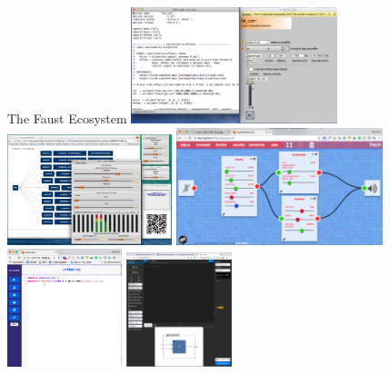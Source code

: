 \begin{frame}[fragile]{The Faust Ecosystem}
	\centering
	\includegraphics[width=0.45\textwidth]{images/faustgen}
	\hspace{0.25cm}
	\includegraphics[width=0.36\textwidth]{images/FaustLiveSession}
	\vspace{0.25cm}
	\href{https://faustplayground.grame.fr/}{\includegraphics[width=0.45\textwidth]{images/faustplayground1}}
	\hspace{0.1cm}
	\href{https://fausteditor.grame.fr/}{\includegraphics[width=0.25\textwidth]{images/faust-editor.png}}
	\hspace{0.1cm}
	\href{https://faustide.grame.fr/}{\includegraphics[width=0.23\textwidth]{images/faust-ide.png}}
\end{frame}

